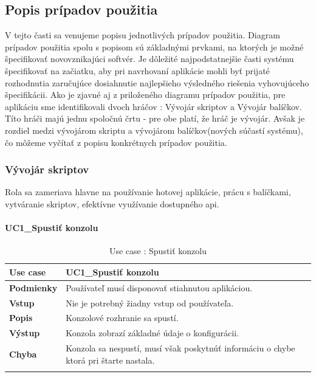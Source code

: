 \subsection{Popis prípadov použitia}
\indent V tejto časti sa venujeme popisu jednotlivých prípadov použitia. Diagram prípadov použitia spolu s popisom sú základnými prvkami, na ktorých je možné špecifikovať novovznikajúci softvér. Je dôležité najpodstatnejšie časti systému špecifikovať na začiatku, aby pri navrhovaní aplikácie mohli byť prijaté rozhodnutia zaručujúce dosiahnutie najlepšieho výsledného riešenia vyhovujúceho špecifikácii. Ako je zjavné aj z priloženého diagramu prípadov použitia, pre aplikáciu sme identifikovali dvoch hráčov : Vývojár skriptov a Vývojár balíčkov. Títo hráči majú jednu spoločnú črtu - pre obe platí, že hráč je vývojár. Avšak je rozdiel medzi vývojárom skriptu a vývojárom balíčkov(nových súčastí systému), čo môžeme vyčítať z popisu konkrétnych prípadov použitia.
\subsubsection{Vývojár skriptov}
\indent Rola sa zameriava hlavne na používanie hotovej aplikácie, prácu s balíčkami, vytváranie skriptov, efektívne využívanie dostupného \acrshort{api}. 
\paragraph{UC1\_Spustiť konzolu}
\begin{center}
	\begin{longtable}{|p{2.5cm}|p{12.2cm}|}
		\hline
		\textbf{Use case} & UC1\_Spustiť konzolu \\ 
		\hline
		\textbf{Podmienky} & Používateľ musí disponovať stiahnutou aplikáciou.\\
		\hline
		\textbf{Vstup} & Nie je potrebný žiadny vstup od používateľa.\\
		\hline
		\textbf{Popis} & Konzolové rozhranie sa spustí. \\ 
		\hline
		\textbf{Výstup} & Konzola zobrazí základné údaje o konfigurácii.\\
		\hline
		\textbf{Chyba} & Konzola sa nespustí, musí však poskytnúť informáciu o chybe ktorá pri štarte nastala.\\
		\hline
	\caption{Use case : Spustiť konzolu}
	\label{table:1}
	\end{longtable}
\end{center}

